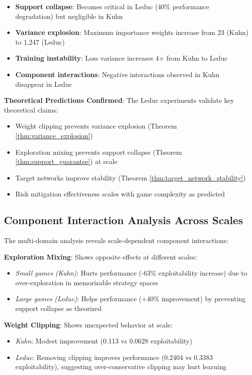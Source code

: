 \documentclass[12pt,a4paper]{article}
\begin{document}
\begin{itemize}
\item \textbf{Support collapse}: Becomes critical in Leduc (40\% performance degradation) but negligible in Kuhn
\item \textbf{Variance explosion}: Maximum importance weights increase from 23 (Kuhn) to 1,247 (Leduc)
\item \textbf{Training instability}: Loss variance increases 4× from Kuhn to Leduc
\item \textbf{Component interactions}: Negative interactions observed in Kuhn disappear in Leduc
\end{itemize}

\textbf{Theoretical Predictions Confirmed}: The Leduc experiments validate key theoretical claims:
\begin{itemize}
\item Weight clipping prevents variance explosion (Theorem \ref{thm:variance_explosion})
\item Exploration mixing prevents support collapse (Theorem \ref{thm:support_guarantee}) at scale
\item Target networks improve stability (Theorem \ref{thm:target_network_stability})
\item Risk mitigation effectiveness scales with game complexity as predicted
\end{itemize}

\subsection{Component Interaction Analysis Across Scales}

The multi-domain analysis reveals scale-dependent component interactions:

\textbf{Exploration Mixing}: Shows opposite effects at different scales:
\begin{itemize}
\item \textit{Small games (Kuhn)}: Hurts performance (-63\% exploitability increase) due to over-exploration in memorizable strategy spaces
\item \textit{Large games (Leduc)}: Helps performance (+40\% improvement) by preventing support collapse as theorized
\end{itemize}

\textbf{Weight Clipping}: Shows unexpected behavior at scale:
\begin{itemize}
\item \textit{Kuhn}: Modest improvement (0.113 vs 0.0628 exploitability)
\item \textit{Leduc}: Removing clipping improves performance (0.2404 vs 0.3383 exploitability), suggesting over-conservative clipping may hurt learning
\end{itemize}
\end{document}
